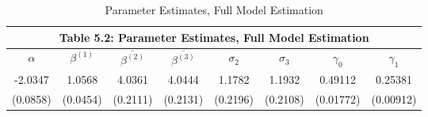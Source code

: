 
\begin{table}
\centering
\begin{tabular}{ |c|c|c|c|c|c|c|c| }
 \hline
 \multicolumn{8}{|c|}{Table 5.2: Parameter Estimates, Full Model Estimation} \\
 \hline
 $\alpha$ & $\beta^{(1)}$ & $\overline{\beta^{(2)}}$ & $\overline{\beta^{(3)}}$ & $\sigma_2$ & $\sigma_3$ & $\gamma_0$ & $\gamma_1$ \\
 \hline
 -2.0347 & 1.0568 & 4.0361 & 4.0444 & 1.1782 & 1.1932 & 0.49112 & 0.25381 \\
(0.0858) & (0.0454) & (0.2111) & (0.2131) & (0.2196) & (0.2108) & (0.01772) & (0.00912)\\
 \hline
\end{tabular}
\label{table5_2}
\caption{Parameter Estimates, Full Model Estimation}
\end{table}
